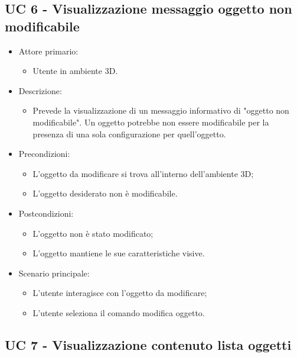 \pagebreak

\subsection{UC 6 - Visualizzazione messaggio oggetto non modificabile}
\begin{itemize}

	\item Attore primario: 
	\begin{itemize}
		\item Utente in ambiente 3D.
	\end{itemize}
	\item Descrizione:
	\begin{itemize}
		\item Prevede la visualizzazione di un messaggio informativo di "oggetto non modificabile".
\newline Un oggetto potrebbe non essere modificabile per la presenza di una sola configurazione per quell'oggetto.
	\end{itemize}
	
	\item Precondizioni:
	\begin{itemize}
		\item L'oggetto da modificare si trova all'interno dell'ambiente 3D;
		\item L'oggetto desiderato non è modificabile.
	\end{itemize}
	
	\item Postcondizioni:
	\begin{itemize}
		\item L'oggetto non è stato modificato;
		\item L'oggetto mantiene le sue caratteristiche visive.
	\end{itemize}
	
	\item Scenario principale:
	\begin{itemize}
		\item L'utente interagisce con l'oggetto da modificare;
		\item L'utente seleziona il comando modifica oggetto.
	\end{itemize}
	
\end{itemize}

\pagebreak

\subsection{UC 7 - Visualizzazione contenuto lista oggetti}

